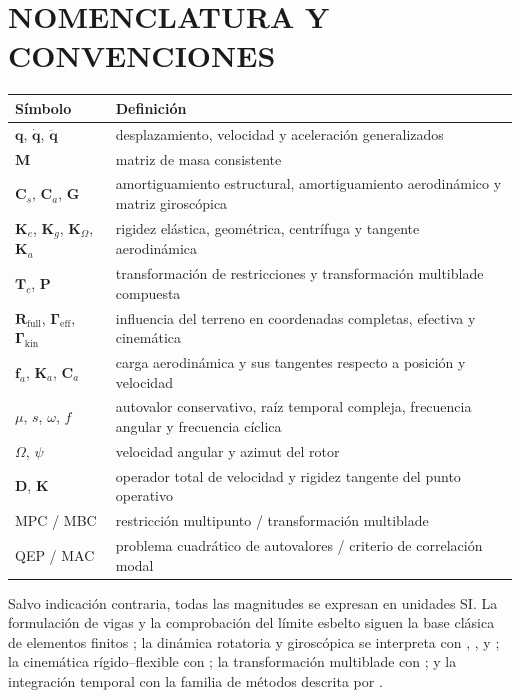 \documentclass[oneside,a4paper,spanish,links]{amca}
\begin{document}
\tableofcontents
\clearpage
\listoffigures
\clearpage

\section*{NOMENCLATURA Y CONVENCIONES}
\begin{center}
\small
\begin{tabularx}{\textwidth}{@{}p{}Y@{}}
\toprule
\textbf{Símbolo} & \textbf{Definición} \\
\midrule
$\bm q$, $\dot{\bm q}$, $\ddot{\bm q}$ & desplazamiento, velocidad y aceleración generalizados \\
$\bm M$ & matriz de masa consistente \\
$\bm C_s$, $\bm C_a$, $\bm G$ & amortiguamiento estructural, amortiguamiento aerodinámico y matriz giroscópica \\
$\bm K_e$, $\bm K_g$, $\bm K_\Omega$, $\bm K_a$ & rigidez elástica, geométrica, centrífuga y tangente aerodinámica \\
$\bm T_c$, $\bm P$ & transformación de restricciones y transformación multiblade compuesta \\
$\bm R_{\mathrm{full}}$, $\bm\Gamma_{\mathrm{eff}}$, $\bm\Gamma_{\mathrm{kin}}$ & influencia del terreno en coordenadas completas, efectiva y cinemática \\
$\bm f_a$, $\bm K_a$, $\bm C_a$ & carga aerodinámica y sus tangentes respecto a posición y velocidad \\
$\mu$, $s$, $\omega$, $f$ & autovalor conservativo, raíz temporal compleja, frecuencia angular y frecuencia cíclica \\
$\Omega$, $\psi$ & velocidad angular y azimut del rotor \\
$\bm D$, $\bm K$ & operador total de velocidad y rigidez tangente del punto operativo \\
MPC / MBC & restricción multipunto / transformación multiblade \\
QEP / MAC & problema cuadrático de autovalores / criterio de correlación modal \\
\bottomrule
\end{tabularx}
\end{center}

Salvo indicación contraria, todas las magnitudes se expresan en unidades SI. La
formulación de vigas y la comprobación del límite esbelto siguen la base clásica
de elementos finitos \citep{reddy2006}; la dinámica rotatoria y giroscópica se
interpreta con \citet{meirovitch1997}, \citet{geradin2015}, \citet{yoo1995} y
\citet{chung2002}; la cinemática rígido--flexible con \citet{shabana2013}; la
transformación multiblade con \citet{bir2008}; y la integración temporal con la
familia de métodos descrita por \citet{newmark1971}.
\end{document}
